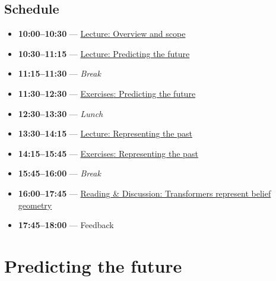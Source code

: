 \documentclass[11pt]{article}
\begin{document}
\subsection{Schedule}\label{schedule}

\begin{itemize}
\item
  \textbf{10:00--10:30} --- \href{https://iliad-intensive.org/downloads/computational-mechanics/computational-mechanics-slides.pdf}{Lecture: Overview and scope}
\item
  \textbf{10:30--11:15} --- \href{https://iliad-intensive.org/downloads/computational-mechanics/computational-mechanics-slides-2-predicting-the-future.pdf}{Lecture: Predicting the future}
\item
  \textbf{11:15--11:30} --- \emph{Break}
\item
  \textbf{11:30--12:30} --- \hyperref[sec:predicting-the-future]{{Exercises}: Predicting the future}
\item
  \textbf{12:30--13:30} --- \emph{Lunch}
\item
  \textbf{13:30--14:15} --- \href{https://iliad-intensive.org/downloads/computational-mechanics/computational-mechanics-slides-3-representing-the-past.pdf}{Lecture: Representing the past}
\item
  \textbf{14:15--15:45} --- \hyperref[sec:representing-the-past]{{Exercises}: Representing the past}
\item
  \textbf{15:45--16:00} --- \emph{Break}
\item
  \textbf{16:00--17:45} --- \hyperref[sec:belief-geometry]{Reading \& Discussion: Transformers represent belief geometry}
\item
  \textbf{17:45--18:00} --- Feedback
\end{itemize}

\section{Predicting the future}\label{sec:predicting-the-future}
\end{document}
